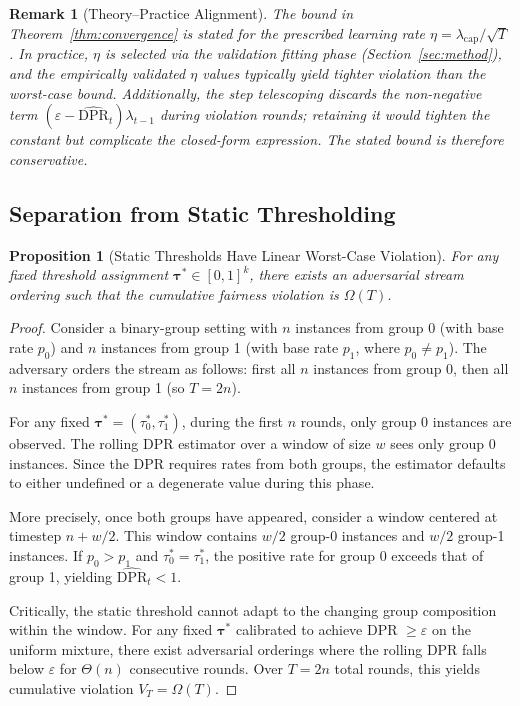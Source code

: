 \documentclass[10pt,twocolumn]{article}
\newtheorem{proposition}[theorem]{Proposition}
\newtheorem{remark}[theorem]{Remark}
\theoremstyle{definition}
\begin{document}
\begin{remark}[Theory--Practice Alignment]
\label{rem:eta}
The bound in Theorem~\ref{thm:convergence} is stated for the prescribed learning rate $\eta = \lambda_{\text{cap}}/\sqrt{T}$. In practice, $\eta$ is selected via the validation fitting phase (Section~\ref{sec:method}), and the empirically validated $\eta$ values typically yield tighter violation than the worst-case bound. Additionally, the step telescoping discards the non-negative term $(\varepsilon - \widehat{\text{DPR}}_t)\lambda_{t-1}$ during violation rounds; retaining it would tighten the constant but complicate the closed-form expression. The stated bound is therefore conservative.
\end{remark}

\subsection{Separation from Static Thresholding}

\begin{proposition}[Static Thresholds Have Linear Worst-Case Violation]
\label{prop:static_lower}
For any fixed threshold assignment $\boldsymbol{\tau}^* \in [0,1]^k$, there exists an adversarial stream ordering such that the cumulative fairness violation is $\Omega(T)$.
\end{proposition}

\begin{proof}
Consider a binary-group setting with $n$ instances from group 0 (with base rate $p_0$) and $n$ instances from group 1 (with base rate $p_1$, where $p_0 \neq p_1$). The adversary orders the stream as follows: first all $n$ instances from group 0, then all $n$ instances from group 1 (so $T = 2n$).

For any fixed $\boldsymbol{\tau}^* = (\tau_0^*, \tau_1^*)$, during the first $n$ rounds, only group 0 instances are observed. The rolling DPR estimator over a window of size $w$ sees only group 0 instances. Since the DPR requires rates from both groups, the estimator defaults to either undefined or a degenerate value during this phase.

More precisely, once both groups have appeared, consider a window centered at timestep $n + w/2$. This window contains $w/2$ group-0 instances and $w/2$ group-1 instances. If $p_0 > p_1$ and $\tau_0^* = \tau_1^*$, the positive rate for group 0 exceeds that of group 1, yielding $\widehat{\text{DPR}}_t < 1$.

Critically, the static threshold cannot adapt to the changing group composition within the window. For any fixed $\boldsymbol{\tau}^*$ calibrated to achieve DPR $\geq \varepsilon$ on the uniform mixture, there exist adversarial orderings where the rolling DPR falls below $\varepsilon$ for $\Theta(n)$ consecutive rounds. Over $T = 2n$ total rounds, this yields cumulative violation $V_T = \Omega(T)$.
\end{proof}
\end{document}
